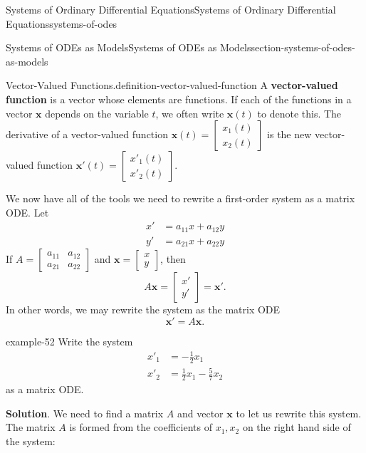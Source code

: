 \documentclass[oneside,10pt,]{book}
\newcommand{\terminology}[1]{\textbf{#1}}
\numberwithin{equation}{section}
\renewcommand{\vec}[1]{\mathbf{#1}}
\newcommand{\amp}{&}
\begin{document}
\begin{chapterptx}{Systems of Ordinary Differential Equations}{}{Systems of Ordinary Differential Equations}{}{}{systems-of-odes}
\begin{sectionptx}{Systems of ODEs as Models}{}{Systems of ODEs as Models}{}{}{section-systems-of-odes-as-models}
\begin{definition}{Vector-Valued Functions.}{definition-vector-valued-function}
A \terminology{vector-valued function} is a vector whose elements are functions. If each of the functions in a vector \(\vec{x}\) depends on the variable \(t\), we often write \(\vec{x}(t)\) to denote this. The derivative of a vector-valued function \(\vec{x}(t) = \begin{bmatrix}x_{1}(t)\\x_{2}(t)\end{bmatrix}\) is the new vector-valued function \(\vec{x}'(t)=\begin{bmatrix}x'_{1}(t)\\x'_{2}(t)\end{bmatrix}\).%
\end{definition}
\hypertarget{p-316}{}%
We now have all of the tools we need to rewrite a first-order system as a matrix ODE. Let%
\begin{align*}
x' \amp= a_{11}x+a_{12}y\\
y' \amp= a_{21}x+a_{22}y
\end{align*}
If \(A = \begin{bmatrix}a_{11}\amp a_{12} \\ a_{21}\amp a_{22}\end{bmatrix}\) and \(\vec{x} = \begin{bmatrix}x\\y\end{bmatrix}\), then%
\begin{equation*}
A\vec{x} = \begin{bmatrix}x'\\y'\end{bmatrix} = \vec{x}'.
\end{equation*}
In other words, we may rewrite the system as the matrix ODE%
\begin{equation*}
\vec{x}' =A\vec{x}.
\end{equation*}
%
\begin{example}{}{example-52}%
\hypertarget{p-317}{}%
Write the system%
\begin{align*}
x'_{1}  \amp = -\frac{1}{2}x_{1}\\
x'_{2}  \amp = \frac{1}{2}x_{1}-\frac{5}{7}x_{2}
\end{align*}
as a matrix ODE.%
\par\smallskip%
\noindent\textbf{Solution}.\hypertarget{solution-49}{}\quad%
\hypertarget{p-318}{}%
We need to find a matrix \(A\) and vector \(\vec{x}\) to let us rewrite this system. The matrix \(A\) is formed from the coefficients of \(x_{1},x_{2}\) on the right hand side of the system:%
\begin{equation*}

\end{equation*}
\end{example}
\end{sectionptx}
\end{chapterptx}
\end{document}
